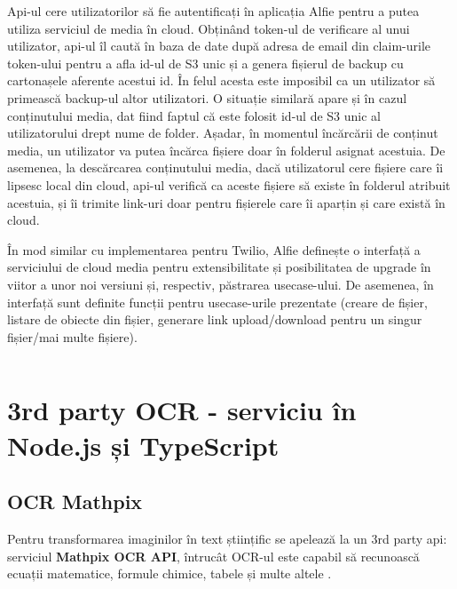 Api-ul cere utilizatorilor să fie autentificați în aplicația Alfie pentru a putea utiliza serviciul de media în cloud. Obținând token-ul de verificare al unui utilizator, api-ul îl caută în baza de date după adresa de email din claim-urile token-ului pentru a afla id-ul de S3 unic și a genera fișierul de backup cu cartonașele aferente acestui id. În felul acesta este imposibil ca un utilizator să primească backup-ul altor utilizatori. O situație similară apare și în cazul conținutului media, dat fiind faptul că este folosit id-ul de S3 unic al utilizatorului drept nume de folder. Așadar, în momentul încărcării de conținut media, un utilizator va putea încărca fișiere doar în folderul asignat acestuia. De asemenea, la descărcarea conținutului media, dacă utilizatorul cere fișiere care îi lipsesc local din cloud, api-ul verifică ca aceste fișiere să existe în folderul atribuit acestuia, și îi trimite link-uri doar pentru fișierele care îi aparțin și care există în cloud.

În mod similar cu implementarea pentru Twilio, Alfie definește o interfață a serviciului de cloud media pentru extensibilitate și posibilitatea de upgrade în viitor a unor noi versiuni și, respectiv, păstrarea usecase-ului. De asemenea, în interfață sunt definite funcții pentru usecase-urile prezentate (creare de fișier, listare de obiecte din fișier, generare link upload/download pentru un singur fișier/mai multe fișiere).

\begin{code}
    \inputminted[frame=single,framesep=2mm,linenos,breaklines,tabsize=2]{go}{code/media-cloud-service.go}
    \label{code:go_media_cloud_service}
\end{code}

\section{3rd party OCR - serviciu în Node.js și TypeScript}

\subsection{OCR Mathpix}

Pentru transformarea imaginilor în text științific se apelează la un 3rd party api: serviciul \textbf{Mathpix OCR API}, întrucât OCR-ul este capabil să recunoască ecuații matematice, formule chimice, tabele și multe altele \cite{mathpixOCR}.

